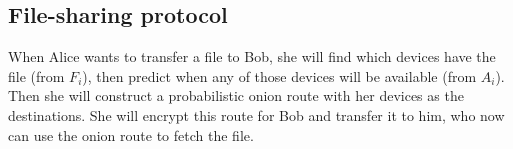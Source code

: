 \subsection{File-sharing protocol}

When Alice wants to transfer a file to Bob, she will find which devices have the 
file (from \(F_i\)), then predict when any of those devices will be available 
(from \(A_i\)).
Then she will construct a probabilistic onion route with her devices as the 
destinations.
She will encrypt this route for Bob and transfer it to him, who now can use the 
onion route to fetch the file.
